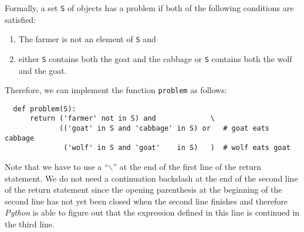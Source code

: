 Formally, a set \texttt{S} of objects has a problem if both of the following conditions
are satisfied:
\begin{enumerate}
\item The farmer is not an element of \texttt{S} and
\item either \texttt{S} contains both the goat and the cabbage or \texttt{S} contains both the wolf and the goat.
\end{enumerate}
Therefore, we can implement the function \texttt{problem} as follows:
\begin{verbatim}
  def problem(S):
      return ('farmer' not in S) and             \
             (('goat' in S and 'cabbage' in S) or   # goat eats cabbage
              ('wolf' in S and 'goat'    in S)   )  # wolf eats goat
\end{verbatim}
Note that we have to use a  ``\texttt{$\backslash$}''
at the end of the first line of the return statement.
We do not need a continuation backslash at the end of the second line of the return statement since
the opening parenthesis at the beginning of the second line has not yet been closed when the second line
finishes and therefore \textsl{Python} is able to figure out that the expression defined in this line is
continued in the third line.

